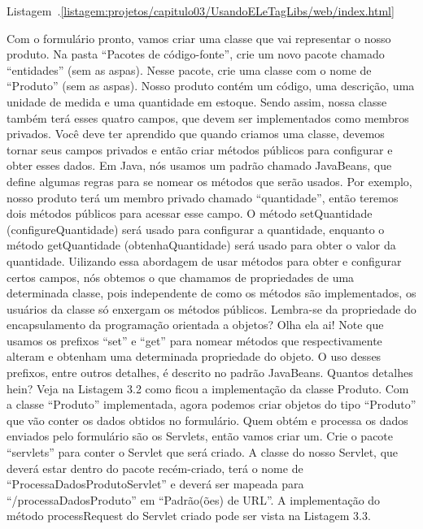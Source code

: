 Listagem~\thechapter.\ref{listagem:projetos/capitulo03/UsandoELeTagLibs/web/index.html}

Com o formulário pronto, vamos criar uma classe que vai representar o nosso produto. Na pasta ``Pacotes de código-fonte'', crie um novo pacote chamado ``entidades'' (sem as aspas). Nesse pacote, crie uma classe com o nome de ``Produto'' (sem as aspas). Nosso produto contém um código, uma descrição, uma unidade de medida e uma quantidade em estoque. Sendo assim, nossa classe também terá esses quatro campos, que devem ser implementados como membros privados. Você deve ter aprendido que quando criamos uma classe, devemos tornar seus campos privados e então criar métodos públicos para configurar e obter esses dados. Em Java, nós usamos um padrão chamado JavaBeans, que define algumas regras para se nomear os métodos que serão usados. Por exemplo, nosso produto terá um membro privado chamado ``quantidade'', então teremos dois métodos públicos para acessar esse campo. O método setQuantidade (configureQuantidade) será usado para configurar a quantidade, enquanto o método getQuantidade (obtenhaQuantidade) será usado para obter o valor da quantidade. Uilizando essa abordagem de usar métodos para obter e configurar certos campos, nós obtemos o que chamamos de propriedades de uma determinada classe, pois independente de como os métodos são implementados, os usuários da classe só enxergam os métodos públicos. Lembra-se da propriedade do encapsulamento da programação orientada a objetos? Olha ela ai! Note que usamos os prefixos ``set'' e ``get'' para nomear métodos que respectivamente alteram e obtenham uma determinada propriedade do objeto. O uso desses prefixos, entre outros detalhes, é descrito no padrão JavaBeans.
Quantos detalhes hein? Veja na Listagem 3.2 como ficou a implementação da classe Produto.
Com a classe ``Produto'' implementada, agora podemos criar objetos do tipo ``Produto'' que vão conter os dados obtidos no formulário. Quem obtém e processa os dados enviados pelo formulário são os Servlets, então vamos criar um. Crie o pacote ``servlets'' para conter o Servlet que será criado. A classe do nosso Servlet, que deverá estar dentro do pacote recém-criado, terá o nome de ``ProcessaDadosProdutoServlet'' e deverá ser mapeada para ``/processaDadosProduto'' em ``Padrão(ões) de URL''. A implementação do método processRequest do Servlet criado pode ser vista na Listagem 3.3.








